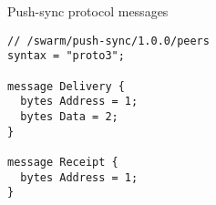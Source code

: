 
\begin{definition}{Push-sync protocol messages}\label{def:push-syncc-messages}

\begin{lstlisting}[]
// /swarm/push-sync/1.0.0/peers
syntax = "proto3";

message Delivery {
  bytes Address = 1;
  bytes Data = 2;
}

message Receipt {
  bytes Address = 1;
}
\end{lstlisting}
\end{definition}
